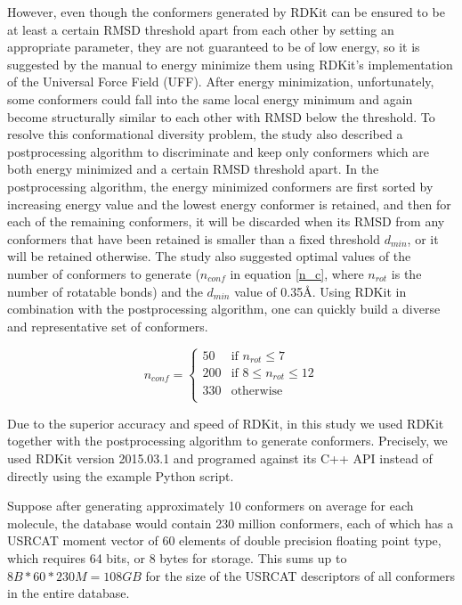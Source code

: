 \documentclass[a4,center,fleqn]{NAR}
\begin{document}
However, even though the conformers generated by RDKit can be ensured to be at least a certain RMSD threshold apart from each other by setting an appropriate parameter, they are not guaranteed to be of low energy, so it is suggested by the manual to energy minimize them using RDKit's implementation of the Universal Force Field (UFF). After energy minimization, unfortunately, some conformers could fall into the same local energy minimum and again become structurally similar to each other with RMSD below the threshold. To resolve this conformational diversity problem, the study \cite{1127} also described a postprocessing algorithm to discriminate and keep only conformers which are both energy minimized and a certain RMSD threshold apart. In the postprocessing algorithm, the energy minimized conformers are first sorted by increasing energy value and the lowest energy conformer is retained, and then for each of the remaining conformers, it will be discarded when its RMSD from any conformers that have been retained is smaller than a fixed threshold $d_{min}$, or it will be retained otherwise. The study \cite{1127} also suggested optimal values of the number of conformers to generate ($n_{conf}$ in equation \eqref{n_c}, where $n_{rot}$ is the number of rotatable bonds) and the $d_{min}$ value of 0.35\AA. Using RDKit in combination with the postprocessing algorithm, one can quickly build a diverse and representative set of conformers.

\begin{equation}
n_{conf}=
\begin{cases}
 50 & \text{if } n_{rot} \leq 7\\
200 & \text{if } 8 \leq n_{rot} \leq 12\\
330 & \text{otherwise}\\
\end{cases}
\label{n_c}
\end{equation}

Due to the superior accuracy and speed of RDKit, in this study we used RDKit together with the postprocessing algorithm to generate conformers. Precisely, we used RDKit version 2015.03.1 and programed against its C++ API instead of directly using the example Python script. %

Suppose after generating approximately 10 conformers on average for each molecule, the database would contain 230 million conformers, each of which has a USRCAT moment vector of 60 elements of double precision floating point type, which requires 64 bits, or 8 bytes for storage. This sums up to $8B*60*230M=108GB$ for the size of the USRCAT descriptors of all conformers in the entire database.
\end{document}
